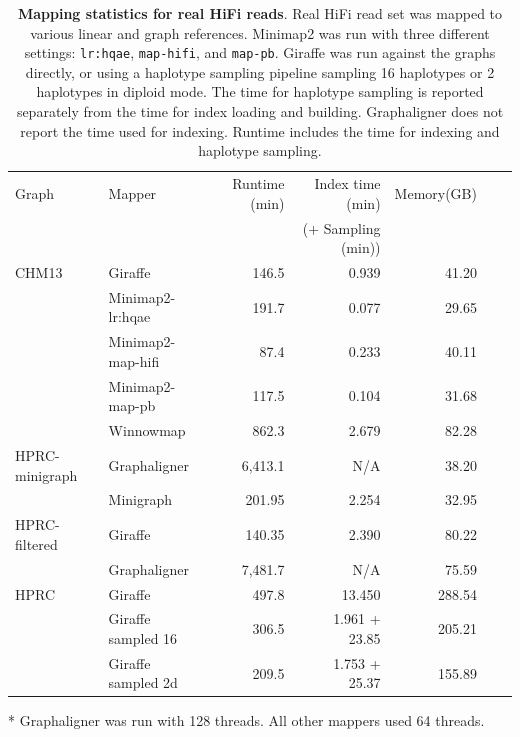 \documentclass[11pt]{ucscthesis}
\begin{document}
\begin{landscape}
\begin{table}[htb]
\begin{threeparttable}
\begin{tabular}{|l|l|r|r|r|r|r|}
    \hline
    Graph	             & Mapper	                     & Runtime (min)	& Index time (min)	        & Memory(GB)	\\
                         &                               &                  & (+ Sampling (min))       &    \\
    \hline
    CHM13	             & Giraffe	                     & 146.5	         & 0.939	        & 41.20	 \\
                         & Minimap2-lr:hqae	            & 191.7	            & 0.077            & 29.65	\\
                         & Minimap2-map-hifi	            & 87.4	            & 0.233	           & 40.11	\\
                         & Minimap2-map-pb	            & 117.5	            & 0.104	           & 31.68	\\
                         & Winnowmap	                    & 862.3	            & 2.679	           & 82.28	\\
    HPRC-minigraph       & Graphaligner\tnote{*}                 & 6,413.1	         & N/A              & 38.20	 \\
                         & Minigraph	                    & 201.95	        & 2.254	           & 32.95	\\
    HPRC-filtered	     & Giraffe	                     & 140.35	         & 2.390	        & 80.22	 \\
                         & Graphaligner\tnote{*}                 & 7,481.7	        & N/A	           & 75.59	\\ 
    HPRC                 & Giraffe	                     & 497.8	         & 13.450	        & 288.54 \\
                         & Giraffe sampled 16	        & 306.5	            & 1.961 + 23.85    & 205.21	\\
                         & Giraffe sampled 2d	        & 209.5	            & 1.753 + 25.37    & 155.89	\\
    
    \hline
    \end{tabular}
    \begin{tablenotes}
        \item [*] Graphaligner was run with 128 threads. All other mappers used 64 threads.
    \end{tablenotes}
    \end{threeparttable}
    \caption[HiFi real read stats]{\textbf{Mapping statistics for real HiFi reads}. Real HiFi read set was mapped to various linear and graph references. Minimap2 was run with three different settings: \texttt{lr:hqae}, \texttt{map-hifi}, and \texttt{map-pb}. Giraffe was run against the graphs directly, or using a haplotype sampling pipeline sampling 16 haplotypes or 2 haplotypes in diploid mode. The time for haplotype sampling is reported separately from the time for index loading and building. Graphaligner does not report the time used for indexing. Runtime includes the time for indexing and haplotype sampling.}
    \label{tab:sup-hifi-real}
\end{table}


\end{landscape}
\end{document}

